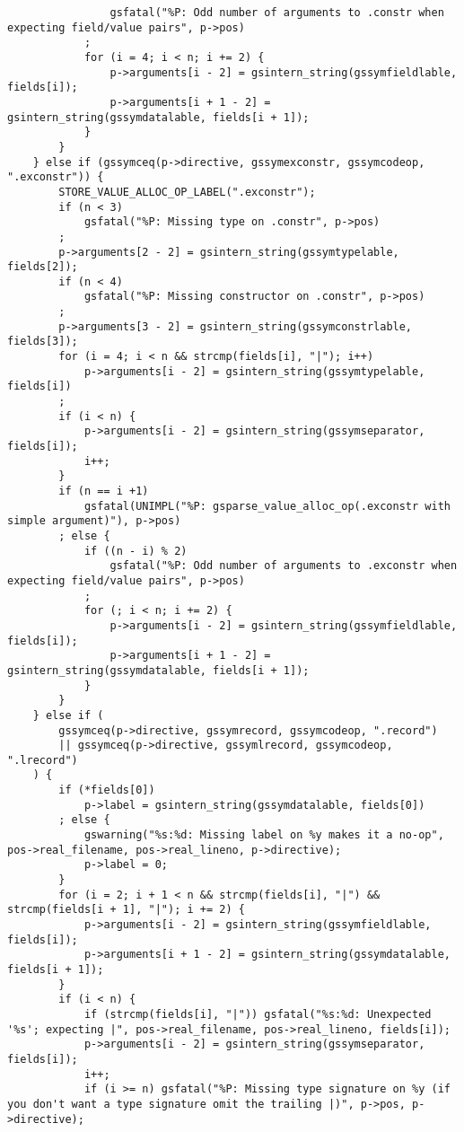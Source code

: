 \documentclass{report}
\begin{document}
\begin{verbatim}
                gsfatal("%P: Odd number of arguments to .constr when expecting field/value pairs", p->pos)
            ;
            for (i = 4; i < n; i += 2) {
                p->arguments[i - 2] = gsintern_string(gssymfieldlable, fields[i]);
                p->arguments[i + 1 - 2] = gsintern_string(gssymdatalable, fields[i + 1]);
            }
        }
    } else if (gssymceq(p->directive, gssymexconstr, gssymcodeop, ".exconstr")) {
        STORE_VALUE_ALLOC_OP_LABEL(".exconstr");
        if (n < 3)
            gsfatal("%P: Missing type on .constr", p->pos)
        ;
        p->arguments[2 - 2] = gsintern_string(gssymtypelable, fields[2]);
        if (n < 4)
            gsfatal("%P: Missing constructor on .constr", p->pos)
        ;
        p->arguments[3 - 2] = gsintern_string(gssymconstrlable, fields[3]);
        for (i = 4; i < n && strcmp(fields[i], "|"); i++)
            p->arguments[i - 2] = gsintern_string(gssymtypelable, fields[i])
        ;
        if (i < n) {
            p->arguments[i - 2] = gsintern_string(gssymseparator, fields[i]);
            i++;
        }
        if (n == i +1)
            gsfatal(UNIMPL("%P: gsparse_value_alloc_op(.exconstr with simple argument)"), p->pos)
        ; else {
            if ((n - i) % 2)
                gsfatal("%P: Odd number of arguments to .exconstr when expecting field/value pairs", p->pos)
            ;
            for (; i < n; i += 2) {
                p->arguments[i - 2] = gsintern_string(gssymfieldlable, fields[i]);
                p->arguments[i + 1 - 2] = gsintern_string(gssymdatalable, fields[i + 1]);
            }
        }
    } else if (
        gssymceq(p->directive, gssymrecord, gssymcodeop, ".record")
        || gssymceq(p->directive, gssymlrecord, gssymcodeop, ".lrecord")
    ) {
        if (*fields[0])
            p->label = gsintern_string(gssymdatalable, fields[0])
        ; else {
            gswarning("%s:%d: Missing label on %y makes it a no-op", pos->real_filename, pos->real_lineno, p->directive);
            p->label = 0;
        }
        for (i = 2; i + 1 < n && strcmp(fields[i], "|") && strcmp(fields[i + 1], "|"); i += 2) {
            p->arguments[i - 2] = gsintern_string(gssymfieldlable, fields[i]);
            p->arguments[i + 1 - 2] = gsintern_string(gssymdatalable, fields[i + 1]);
        }
        if (i < n) {
            if (strcmp(fields[i], "|")) gsfatal("%s:%d: Unexpected '%s'; expecting |", pos->real_filename, pos->real_lineno, fields[i]);
            p->arguments[i - 2] = gsintern_string(gssymseparator, fields[i]);
            i++;
            if (i >= n) gsfatal("%P: Missing type signature on %y (if you don't want a type signature omit the trailing |)", p->pos, p->directive);

\end{verbatim}
\end{document}
